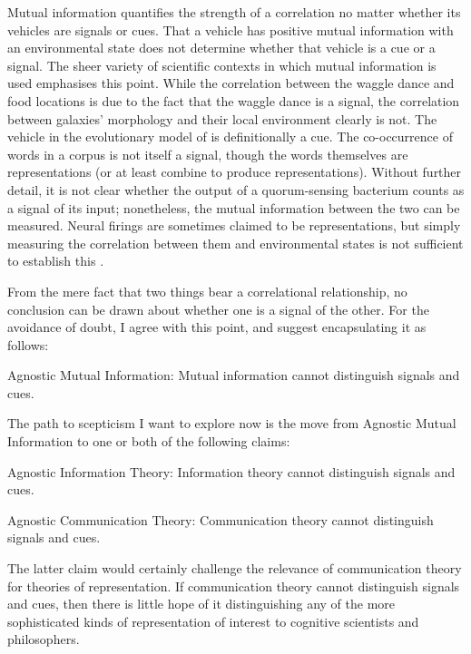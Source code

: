 Mutual information quantifies the strength of a correlation no matter whether its vehicles are signals or cues.
That a vehicle has positive mutual information with an environmental state does not determine whether that vehicle is a cue or a signal.
The sheer variety of scientific contexts in which mutual information is used emphasises this point.
While the correlation between the waggle dance and food locations is due to the fact that the waggle dance is a signal, the correlation between galaxies' morphology and their local environment clearly is not.
The vehicle in the evolutionary model of \citet{donaldson-matasci2010fitness} is definitionally a cue.
The co-occurrence of words in a corpus is not itself a signal, though the words themselves are representations (or at least combine to produce representations).
Without further detail, it is not clear whether the output of a quorum-sensing bacterium counts as a signal of its input; nonetheless, the mutual information between the two can be measured.
Neural firings are sometimes claimed to be representations, but simply measuring the correlation between them and environmental states is not sufficient to establish this \citep{rathkopf2017neural}.

From the mere fact that two things bear a correlational relationship, no conclusion can be drawn about whether one is a signal of the other.
For the avoidance of doubt, I agree with this point, and suggest encapsulating it as follows:

\begin{myquote}
{\sc Agnostic Mutual Information}: Mutual information cannot distinguish signals and cues.
\end{myquote}

\noindent The path to scepticism I want to explore now is the move from {\sc Agnostic Mutual Information} to one or both of the following claims:

\begin{myquote}
{\sc Agnostic Information Theory}: Information theory cannot distinguish signals and cues.
\end{myquote}

\begin{myquote}
{\sc Agnostic Communication Theory}: Communication theory cannot distinguish signals and cues.
\end{myquote}

\noindent The latter claim would certainly challenge the relevance of communication theory for theories of representation.
If communication theory cannot distinguish signals and cues, then there is little hope of it distinguishing any of the more sophisticated kinds of representation of interest to cognitive scientists and philosophers.

